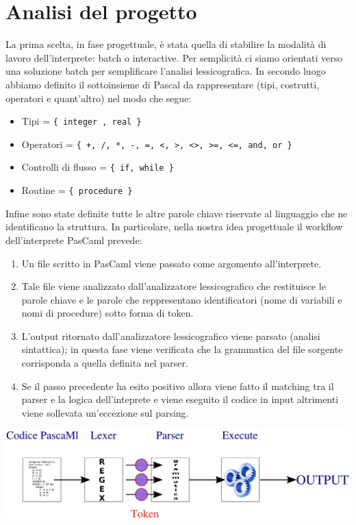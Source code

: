 \documentclass[a4paper,10pt]{article}
\begin{document}
\section{Analisi del progetto}
La prima scelta, in fase progettuale, \`e stata quella di stabilire la 
modalit\`a di lavoro dell'interprete: batch o interactive. Per semplicit\`a ci
siamo orientati verso una soluzione batch per semplificare l'analisi
lessicografica. In secondo luogo abbiamo definito il sottoinsieme di Pascal da
rappresentare (tipi, costrutti, operatori e quant'altro) nel modo che segue:
\begin{itemize}
 \item Tipi = \verb|{ integer , real }|
 \item Operatori = \verb|{ +, /, *, -, =, <, >, <>, >=, <=, and, or }|
 \item Controlli di flusso = \verb|{ if, while }|
 \item Routine = \verb|{ procedure }|
\end{itemize}
Infine sono state definite tutte le altre parole chiave riservate al linguaggio
che ne identificano la struttura. In particolare, nella nostra idea progettuale
il workflow dell'interprete PasCaml prevede:
\begin{enumerate}
 \item Un file scritto in PasCaml viene passato come argomento all'interprete.
 \item Tale file viene analizzato dall'analizzatore lessicografico che 
restituisce le parole chiave e le parole che reppresentano identificatori (nome
di variabili e nomi di procedure) sotto forma di token.
 \item L'output ritornato dall'analizzatore lessicografico viene parsato 
(analisi sintattica); in questa fase viene verificata che la grammatica del file
sorgente corrisponda a quella definita nel parser.
 \item Se il passo precedente ha esito positivo allora viene fatto il matching 
tra il parser e la logica dell'inteprete e viene eseguito il codice in input
altrimenti viene sollevata un'eccezione sul parsing.
\end{enumerate}
 \includegraphics[scale=0.25]{./pics/pascaml01.png}
\end{document}
